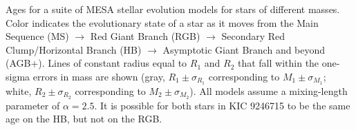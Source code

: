 \label{fig:mesa} Ages for a suite of MESA stellar evolution models for stars of different masses. Color indicates the evolutionary state of a star as it moves from the Main Sequence (MS) $\rightarrow$ Red Giant Branch (RGB) $\rightarrow$ Secondary Red Clump/Horizontal Branch (HB) $\rightarrow$ Asymptotic Giant Branch and beyond (AGB+). Lines of constant radius equal to $R_1$ and $R_2$ that fall within the one-sigma errors in mass are shown (gray, $R_1 \pm \sigma_{R_1}$ corresponding to $M_1 \pm \sigma_{M_1}$; white, $R_2 \pm \sigma_{R_2}$ corresponding to $M_2 \pm \sigma_{M_2}$). All models assume a mixing-length parameter of $\alpha = 2.5$. It is possible for both stars in KIC 9246715 to be the same age on the HB, but not on the RGB.
